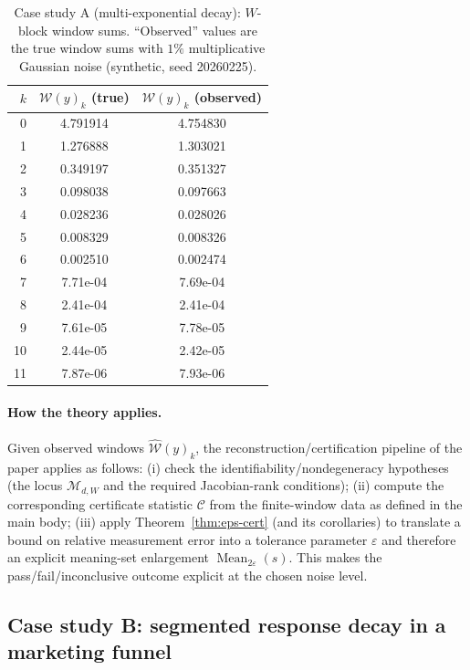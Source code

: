 \documentclass[11pt,reqno]{amsart}
\theoremstyle{definition}
\theoremstyle{remark}
\newcommand{\1}{\mathbf{1}}
\newcommand{\Mean}{\operatorname{Mean}}
\newcommand{\eps}{\varepsilon}
\begin{document}
\begin{table}[t]
\centering
\caption{Case study A (multi-exponential decay): $W$-block window sums. ``Observed'' values are the true window sums with $1\%$ multiplicative Gaussian noise (synthetic, seed 20260225).}
\label{tab:caseA-window-sums}
\begin{tabular}{rcc}
\toprule
$k$ & $\mathcal W(y)_k$ (true) & $\mathcal W(y)_k$ (observed)\\
\midrule
0 & 4.791914 & 4.754830 \\
1 & 1.276888 & 1.303021 \\
2 & 0.349197 & 0.351327 \\
3 & 0.098038 & 0.097663 \\
4 & 0.028236 & 0.028026 \\
5 & 0.008329 & 0.008326 \\
6 & 0.002510 & 0.002474 \\
7 & 7.71e-04 & 7.69e-04 \\
8 & 2.41e-04 & 2.41e-04 \\
9 & 7.61e-05 & 7.78e-05 \\
10 & 2.44e-05 & 2.42e-05 \\
11 & 7.87e-06 & 7.93e-06 \\
\bottomrule
\end{tabular}
\end{table}

\paragraph{How the theory applies.}
Given observed windows $\widehat{\mathcal W}(y)_k$, the reconstruction/certification pipeline of the paper applies as follows:
(i) check the identifiability/nondegeneracy hypotheses (the locus $\mathcal M_{d,W}$ and the required Jacobian-rank conditions);
(ii) compute the corresponding certificate statistic $\mathcal C$ from the finite-window data as defined in the main body;
(iii) apply Theorem~\ref{thm:eps-cert} (and its corollaries) to translate a bound on relative measurement error into a tolerance parameter $\eps$ and therefore an explicit meaning-set enlargement $\Mean_{2\eps}(s)$.
This makes the pass/fail/inconclusive outcome explicit at the chosen noise level.

\subsection{Case study B: segmented response decay in a marketing funnel}
\end{document}

